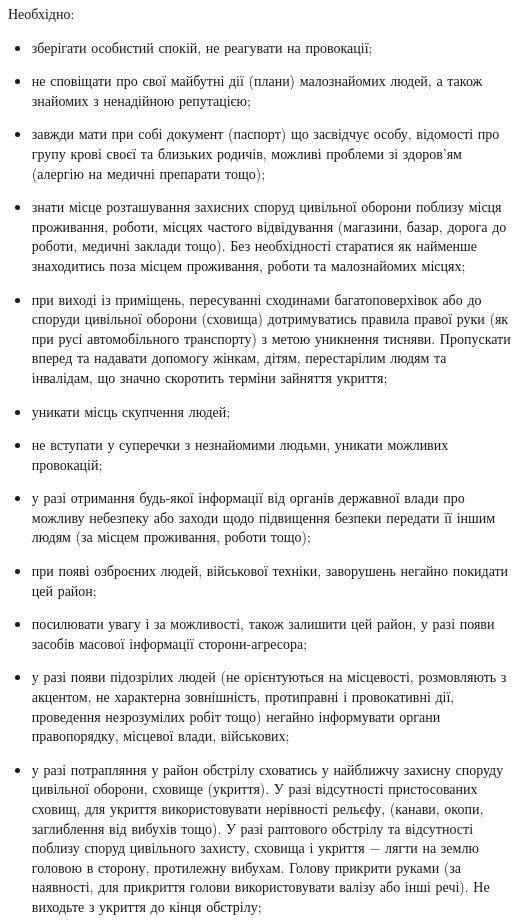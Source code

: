 Необхідно:
\begin{itemize}
	\item зберігати особистий спокій, не реагувати на провокації;
	\item не сповіщати про свої майбутні дії (плани) малознайомих людей, а також знайомих з ненадійною репутацією;
	\item завжди мати при собі документ (паспорт) що засвідчує особу, відомості про групу крові своєї та близьких родичів, можливі проблеми зі здоров’ям (алергію на медичні препарати тощо);
	\item знати місце розташування захисних споруд цивільної оборони поблизу місця проживання, роботи, місцях частого відвідування (магазини, базар, дорога до роботи, медичні заклади тощо). Без необхідності старатися як найменше знаходитись поза місцем проживання, роботи та малознайомих місцях;
	\item при виході із приміщень, пересуванні сходинами багатоповерхівок або до споруди цивільної оборони (сховища) дотримуватись правила правої руки (як при русі автомобільного транспорту) з метою уникнення тисняви. Пропускати вперед та надавати допомогу жінкам, дітям, перестарілим людям та інвалідам, що значно скоротить терміни зайняття укриття;
	\item уникати місць скупчення людей;
	\item не вступати у суперечки з незнайомими людьми, уникати можливих провокацій;
	\item у разі отримання будь-якої інформації від органів державної влади про можливу небезпеку або заходи щодо підвищення безпеки передати її іншим людям (за місцем проживання, роботи тощо);
	\item при появі озброєних людей, військової техніки, заворушень негайно покидати цей район;
	\item посилювати увагу і за можливості, також залишити цей район, у разі появи засобів масової інформації сторони-агресора;
	\item у разі появи підозрілих людей (не орієнтуються на місцевості, розмовляють з акцентом, не характерна зовнішність, протиправні і провокативні дії, проведення незрозумілих робіт тощо) негайно інформувати органи правопорядку, місцевої влади, військових;
	\item у разі потрапляння у район обстрілу сховатись у найближчу захисну споруду цивільної оборони, сховище (укриття). У разі відсутності пристосованих сховищ, для укриття використовувати нерівності рельєфу, (канави, окопи, заглиблення від вибухів тощо). У разі раптового обстрілу та відсутності поблизу споруд цивільного захисту, сховища і укриття − лягти на землю головою в сторону, протилежну вибухам. Голову прикрити руками (за наявності, для прикриття голови використовувати валізу або інші речі). Не виходьте з укриття до кінця обстрілу;

\end{itemize}
